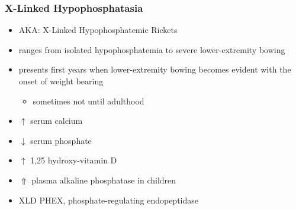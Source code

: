 \documentclass{scrartcl}
\begin{document}
\subsubsection{X-Linked Hypophosphatasia}
\label{sec:org4f5a8ce}
\begin{itemize}
\item AKA: X-Linked Hypophosphatemic Rickets
\item ranges from isolated hypophosphatemia to severe lower-extremity bowing
\item presents first  years when lower-extremity bowing becomes
evident with the onset of weight bearing
\begin{itemize}
\item sometimes not until adulthood
\end{itemize}
\item \(\uparrow\) serum calcium
\item \(\downarrow\) serum phosphate
\item \(\uparrow\) 1,25 hydroxy-vitamin D
\item \(\Uparrow\) plasma alkaline phosphatase in children
\item XLD PHEX, phosphate-regulating endopeptidase
\end{itemize}
\end{document}
